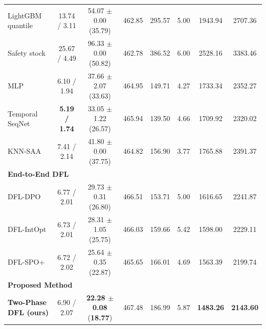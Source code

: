 \documentclass[11pt,a4paper]{article}
\theoremstyle{definition}
\theoremstyle{remark}
\begin{document}
\begin{table}[H]
{\begin{tabular}{@{}lccccccc@{}}
LightGBM quantile & 13.74 / 3.11 & 54.07 $\pm$ 0.00 (35.79) & 462.85 & 295.57 & 5.00 & 1943.94 & 2707.36 \\
Safety stock & 25.67 / 4.49 & 96.33 $\pm$ 0.00 (50.82) & 462.78 & 386.52 & 6.00 & 2528.16 & 3383.46 \\
MLP & 6.10 / 1.94 & 37.66 $\pm$ 2.07 (33.63) & 464.95 & 149.71 & 4.27 & 1733.34 & 2352.27 \\
Temporal SeqNet & \textbf{5.19 / 1.74} & 33.05 $\pm$ 1.22 (26.57) & 465.94 & 139.50 & 4.66 & 1709.92 & 2320.02 \\
KNN-SAA & 7.41 / 2.14 & 41.80 $\pm$ 0.00 (37.75) & 464.82 & 156.90 & 3.77 & 1765.88 & 2391.37 \\
\midrule
\multicolumn{8}{l}{\textbf{End-to-End DFL}} \\
DFL-DPO & 6.77 / 2.01 & 29.73 $\pm$ 0.31 (26.80) & 466.51 & 153.71 & 5.00 & 1616.65 & 2241.87 \\
DFL-IntOpt & 6.73 / 2.01 & 28.31 $\pm$ 1.05 (25.75) & 466.03 & 159.66 & 5.42 & 1598.00 & 2229.11 \\
DFL-SPO+ & 6.72 / 2.02 & 25.64 $\pm$ 0.35 (22.87) & 465.65 & 166.01 & 4.69 & 1563.39 & 2199.74 \\
\midrule
\multicolumn{8}{l}{\textbf{Proposed Method}} \\
\textbf{Two-Phase DFL (ours)} & 6.90 / 2.07 & \textbf{22.28 $\pm$ 0.08} (\textbf{18.77}) & 467.48 & 186.99 & 5.87 & \textbf{1483.26} & \textbf{2143.60} \\
\bottomrule
\end{tabular}%
}
\end{table}
\end{document}
